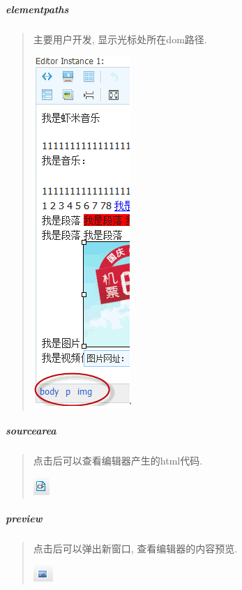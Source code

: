 \documentclass[letterpaper,10pt,english]{sphinxmanual}
\begin{document}
\subparagraph{elementpaths}
\label{relatedproj/editorguide/plugin:elementpaths}\begin{quote}

主要用户开发, 显示光标处所在dom路径.

\includegraphics{elementpaths1.png}
\end{quote}


\subparagraph{sourcearea}
\label{relatedproj/editorguide/plugin:sourcearea}\begin{quote}

点击后可以查看编辑器产生的html代码.

\includegraphics{sourcearea1.png}
\end{quote}


\subparagraph{preview}
\label{relatedproj/editorguide/plugin:preview}\begin{quote}

点击后可以弹出新窗口, 查看编辑器的内容预览.

\includegraphics{preview1.png}
\end{quote}
\end{document}
